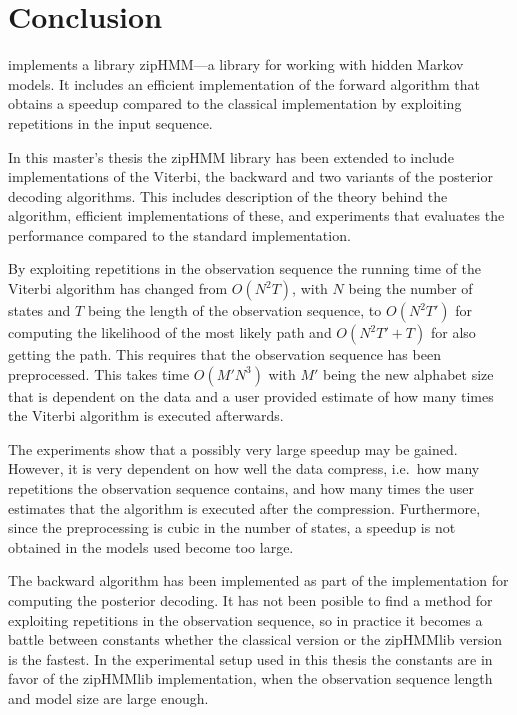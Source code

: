 \chapter{Conclusion}
\label{cha:conclusion}

\citet{sand2013ziphmmlib} implements a library zipHMM---a library for working
with hidden Markov models. It includes an efficient implementation of the forward
algorithm that obtains a speedup compared to the classical implementation by
exploiting repetitions in the input sequence.

In this master's thesis the zipHMM library has been extended to include
implementations of the Viterbi, the backward and two variants of the posterior
decoding algorithms. This includes description of the theory behind the
algorithm, efficient implementations of these, and experiments that evaluates
the performance compared to the standard implementation.

By exploiting repetitions in the observation sequence the running time of the
Viterbi algorithm has changed from $O(N^2 T)$, with $N$ being the number of
states and $T$ being the length of the observation sequence, to $O(N^2 T')$ for
computing the likelihood of the most likely path and $O(N^2 T' + T)$ for also
getting the path. This requires that the observation sequence has been
preprocessed. This takes time $O(M' N^3)$ with $M'$ being the new alphabet size
that is dependent on the data and a user provided estimate of how many times
the Viterbi algorithm is executed afterwards.

The experiments show that a possibly very large speedup may be gained. However,
it is very dependent on how well the data compress, i.e.\ how many repetitions
the observation sequence contains, and how many times the user estimates that the
algorithm is executed after the compression. Furthermore, since the
preprocessing is cubic in the number of states, a speedup is not obtained in
the models used become too large.

The backward algorithm has been implemented as part of the implementation for
computing the posterior decoding. It has not been posible to find a method for
exploiting repetitions in the observation sequence, so in practice it becomes a
battle between constants whether the classical version or the zipHMMlib version
is the fastest. In the experimental setup used in this thesis the constants are
in favor of the zipHMMlib implementation, when the observation sequence length and
model size are large enough.

